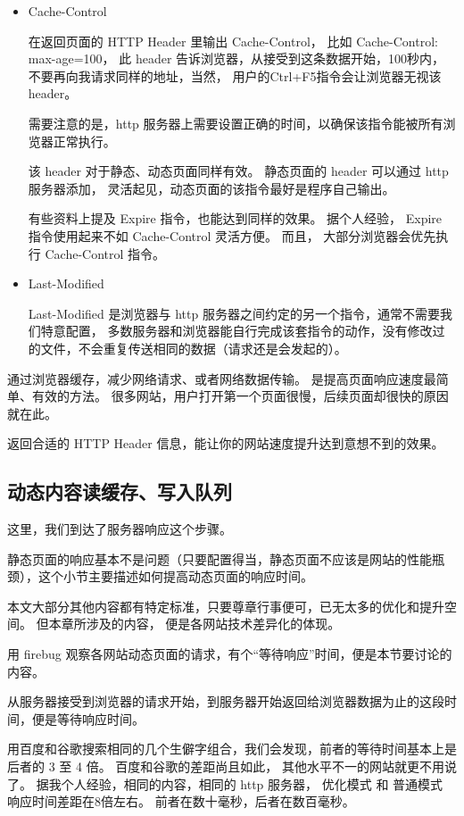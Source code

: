 \documentclass{article}
\begin{document}
  \begin{itemize}
  \item Cache-Control

    在返回页面的 HTTP Header 里输出 Cache-Control， 比如 Cache-Control: max-age=100，
    此 header 告诉浏览器，从接受到这条数据开始，100秒内，不要再向我请求同样的地址，当然，
    用户的Ctrl+F5指令会让浏览器无视该header。

    需要注意的是，http 服务器上需要设置正确的时间，以确保该指令能被所有浏览器正常执行。

    该 header 对于静态、动态页面同样有效。 静态页面的 header 可以通过 http 服务器添加，
    灵活起见，动态页面的该指令最好是程序自己输出。

    有些资料上提及 Expire 指令，也能达到同样的效果。 据个人经验， Expire 指令使用起来不如 Cache-Control
    灵活方便。 而且， 大部分浏览器会优先执行 Cache-Control 指令。

  \item Last-Modified

    Last-Modified 是浏览器与 http 服务器之间约定的另一个指令，通常不需要我们特意配置，
    多数服务器和浏览器能自行完成该套指令的动作，没有修改过的文件，不会重复传送相同的数据（请求还是会发起的）。
  \end{itemize}

  通过浏览器缓存，减少网络请求、或者网络数据传输。 是提高页面响应速度最简单、有效的方法。
  很多网站，用户打开第一个页面很慢，后续页面却很快的原因就在此。

  返回合适的 HTTP Header 信息，能让你的网站速度提升达到意想不到的效果。
  
  \subsection{动态内容读缓存、写入队列}

  这里，我们到达了服务器响应这个步骤。

  静态页面的响应基本不是问题（只要配置得当，静态页面不应该是网站的性能瓶颈），这个小节主要描述如何提高动态页面的响应时间。

  本文大部分其他内容都有特定标准，只要尊章行事便可，已无太多的优化和提升空间。 但本章所涉及的内容，
  便是各网站技术差异化的体现。

  用 firebug 观察各网站动态页面的请求，有个“等待响应”时间，便是本节要讨论的内容。

  从服务器接受到浏览器的请求开始，到服务器开始返回给浏览器数据为止的这段时间，便是等待响应时间。

  用百度和谷歌搜索相同的几个生僻字组合，我们会发现，前者的等待时间基本上是后者的 3 至 4 倍。 百度和谷歌的差距尚且如此，
  其他水平不一的网站就更不用说了。 据我个人经验，相同的内容，相同的 http 服务器，
  优化模式 和 普通模式 响应时间差距在8倍左右。
  前者在数十毫秒，后者在数百毫秒。
\end{document}
